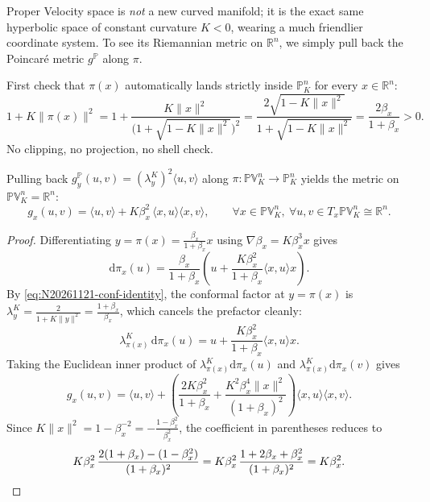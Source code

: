 Proper Velocity space is \emph{not} a new curved manifold; it is the exact same hyperbolic space of constant curvature \(K<0\), wearing a much friendlier coordinate system. To see its Riemannian metric on \(\mathbb{R}^n\), we simply pull back the Poincar\'e metric \(g^{\mathbb{P}}\) along \(\pi\).

First check that \(\pi(x)\) automatically lands strictly inside \(\mathbb{P}_K^n\) for every \(x\in\mathbb{R}^n\):
\begin{equation}
  1 + K\|\pi(x)\|^2
  = 1 + \frac{K\|x\|^2}{\bigl(1+\sqrt{1-K\|x\|^2}\bigr)^2}
  = \frac{2\sqrt{1-K\|x\|^2}}{1+\sqrt{1-K\|x\|^2}}
  = \frac{2\beta_x}{1+\beta_x} > 0.
  \label{eq:N20261121-conf-identity}
\end{equation}
No clipping, no projection, no shell check.

\begin{proposition}
Pulling back \(g_y^{\mathbb{P}}(u,v) = (\lambda_y^K)^2\langle u,v\rangle\) along \(\pi:\mathbb{PV}_K^n\to\mathbb{P}_K^n\) yields the metric on \(\mathbb{PV}_K^n=\mathbb{R}^n\):
\begin{equation}
  g_x(u,v) = \langle u,v\rangle + K\beta_x^2\,\langle x,u\rangle\langle x,v\rangle,
  \qquad \forall x\in\mathbb{PV}_K^n,\ \forall u,v\in T_x\mathbb{PV}_K^n\cong\mathbb{R}^n.
  \label{eq:N20261121-metric}
\end{equation}
\end{proposition}

\begin{proof}
Differentiating \(y=\pi(x)=\frac{\beta_x}{1+\beta_x}x\) using \(\nabla\beta_x = K\beta_x^3 x\) gives
\[
  \mathrm{d}\pi_x(u) = \frac{\beta_x}{1+\beta_x}\left(u + \frac{K\beta_x^2}{1+\beta_x}\langle x,u\rangle x\right).
\]
By \eqref{eq:N20261121-conf-identity}, the conformal factor at \(y=\pi(x)\) is \(\lambda_y^K = \frac{2}{1+K\|y\|^2} = \frac{1+\beta_x}{\beta_x}\), which cancels the prefactor cleanly:
\[
  \lambda_{\pi(x)}^K\,\mathrm{d}\pi_x(u) = u + \frac{K\beta_x^2}{1+\beta_x}\langle x,u\rangle x.
\]
Taking the Euclidean inner product of \(\lambda_{\pi(x)}^K\mathrm{d}\pi_x(u)\) and \(\lambda_{\pi(x)}^K\mathrm{d}\pi_x(v)\) gives
\[
  g_x(u,v) = \langle u,v\rangle + \left(\frac{2K\beta_x^2}{1+\beta_x} + \frac{K^2\beta_x^4\|x\|^2}{(1+\beta_x)^2}\right)\langle x,u\rangle\langle x,v\rangle.
\]
Since \(K\|x\|^2 = 1-\beta_x^{-2} = -\frac{1-\beta_x^2}{\beta_x^2}\), the coefficient in parentheses reduces to
\[
  K\beta_x^2\,\frac{2(1+\beta_x)-(1-\beta_x^2)}{(1+\beta_x)^2}
  = K\beta_x^2\,\frac{1+2\beta_x+\beta_x^2}{(1+\beta_x)^2}
  = K\beta_x^2. \qedhere
\]
\end{proof}

